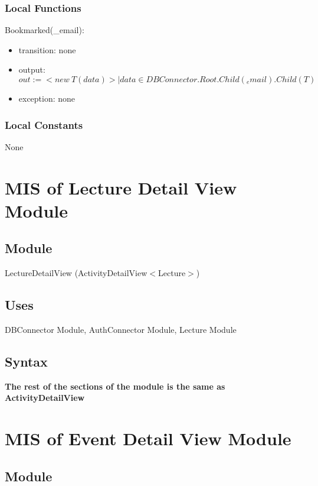 \documentclass[12pt, titlepage]{article}
\begin{document}
\subsubsection{Local Functions}

\noindent Bookmarked(\_email):
\begin{itemize}
\item transition: none
\item output: $out := <new \ T(data)> | data \in DBConnector.Root.Child(_email).Child(T)$
\item exception: none
\end{itemize}

\subsubsection{Local Constants}

None

\newpage

\section{MIS of Lecture Detail View Module} \label{mLDV}

\subsection{Module}

LectureDetailView (ActivityDetailView$<$Lecture$>$)

\subsection{Uses}

DBConnector Module,  AuthConnector Module, Lecture Module

\subsection{Syntax}
\textbf{The rest of the sections of the module is the same as ActivityDetailView}

\newpage

\section{MIS of Event Detail View Module} \label{mEDV}

\subsection{Module}
\end{document}
